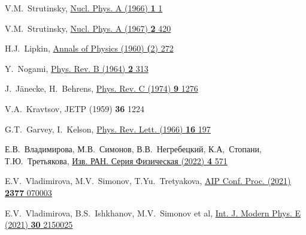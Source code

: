 \renewcommand{\refname}{Список литературы}
\begin{thebibliography}{9}

V.M.~Strutinsky,
\href{https://doi.org/10.1016/0375-9474(68)90699-4}
  {Nucl. Phys. A (1966) \textbf{1} 1}

V.M.~Strutinsky,
\href{https://doi.org/10.1016/0375-9474(67)90510-6}
  {Nucl. Phys. A (1967) \textbf{2} 420}

H.J.~Lipkin,
\href{https://doi.org/10.1016/0003-4916(60)90032-4}
  {Annals of Physics (1960) \textbf(2) 272}

Y.~Nogami,
\href{https://doi.org/10.1103/PhysRev.134.B313}
  {Phys. Rev. B (1964) \textbf{2} 313}

J.~J{\"a}necke, H.~Behrens,
\href{https://doi.org/10.1103/PhysRevC.9.1276}
  {Phys. Rev. C (1974) \textbf{9} 1276}

V.A.~Kravtsov,
JETP (1959) \textbf{36} 1224

G.T.~Garvey, I.~Kelson,
\href{https://doi.org/10.1103/PhysRevLett.16.197}
  {Phys. Rev. Lett. (1966) \textbf{16} 197}

Е.В.~Владимирова, М.В.~Симонов, В.В.~Негребецкий, К.А,~Стопани, Т.Ю.~Третьякова,
\href{https://doi.org/10.31857/S0367676522040263}
  {Изв. РАН. Серия Физическая (2022) \textbf{4} 571}

E.V.~Vladimirova, M.V.~Simonov, T.Yu.~Tretyakova,
\href{https://doi.org/10.1063/5.0063340}
  {AIP Conf. Proc. (2021) \textbf{2377} 070003}

E.V.~Vladimirova, B.S.~Ishkhanov, M.V.~Simonov et al,
\href{https://doi.org/10.1142/S0218301321500257}
  {Int. J. Modern Phys. E (2021) \textbf{30} 2150025}


\end{thebibliography}
